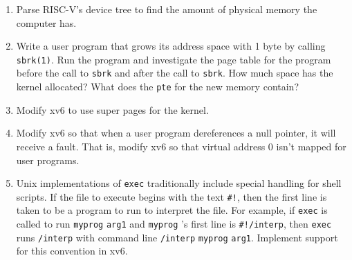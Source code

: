 \begin{enumerate}
  
\item Parse RISC-V's device tree to find the amount of physical memory
the computer has.

\item Write a user program that grows its address space with 1 byte by calling
\lstinline{sbrk(1)}.
Run the  program and investigate the page table for the program before the call
to
\lstinline{sbrk}
and after the call to
\lstinline{sbrk}.
How much space has the kernel allocated?  What does the
\lstinline{pte}
for the new memory contain?

\item Modify xv6 to use super pages for the kernel.

\item Modify xv6 so that when a user program dereferences a null pointer, it will
receive a fault.  That is, modify xv6 so that virtual address 0 isn't mapped for
user programs.

\item Unix implementations of
\lstinline{exec}
traditionally include special handling for shell scripts.
If the file to execute begins with the text
\lstinline{#!},
then the first line is taken to be a program
to run to interpret the file.
For example, if
\lstinline{exec}
is called to run
\lstinline{myprog}
\lstinline{arg1}
and
\lstinline{myprog} 's
first line is
\lstinline{#!/interp},
then
\lstinline{exec}
runs
\lstinline{/interp}
with command line
\lstinline{/interp}
\lstinline{myprog}
\lstinline{arg1}.
Implement support for this convention in xv6.

\end{enumerate}

